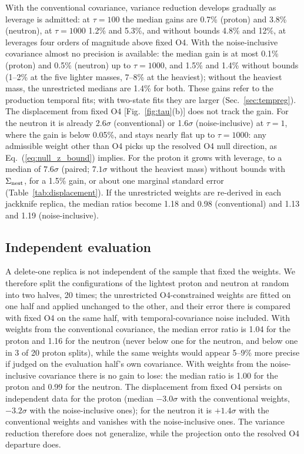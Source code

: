 \documentclass[aps,prd,preprint,nofootinbib,floatfix]{revtex4-2}
\begin{document}
With the conventional covariance, variance reduction develops gradually as leverage is admitted: at $\tau=100$ the median gains are 0.7\% (proton) and 3.8\% (neutron), at $\tau=1000$ 1.2\% and 5.3\%, and without bounds 4.8\% and 12\%, at leverages four orders of magnitude above fixed O4. With the noise-inclusive covariance almost no precision is available: the median gain is at most 0.1\% (proton) and 0.5\% (neutron) up to $\tau=1000$, and 1.5\% and 1.4\% without bounds (1--2\% at the five lighter masses, 7--8\% at the heaviest); without the heaviest mass, the unrestricted medians are 1.4\% for both. These gains refer to the production temporal fits; with two-state fits they are larger (Sec.~\ref{sec:tempreg}). The displacement from fixed O4 [Fig.~\ref{fig:tau}(b)] does not track the gain. For the neutron it is already 2.6$\sigma$ (conventional) or 1.6$\sigma$ (noise-inclusive) at $\tau=1$, where the gain is below 0.05\%, and stays nearly flat up to $\tau=1000$: any admissible weight other than O4 picks up the resolved O4 null direction, as Eq.~(\ref{eq:null_z_bound}) implies. For the proton it grows with leverage, to a median of $7.6\sigma$ (paired; $7.1\sigma$ without the heaviest mass) without bounds with $\Sigma_{\rm nest}$, for a 1.5\% gain, or about one marginal standard error (Table~\ref{tab:displacement}). If the unrestricted weights are re-derived in each jackknife replica, the median ratios become 1.18 and 0.98 (conventional) and 1.13 and 1.19 (noise-inclusive).

\subsection{Independent evaluation}

A delete-one replica is not independent of the sample that fixed the weights. We therefore split the configurations of the lightest proton and neutron at random into two halves, 20 times; the unrestricted O4-constrained weights are fitted on one half and applied unchanged to the other, and their error there is compared with fixed O4 on the same half, with temporal-covariance noise included. With weights from the conventional covariance, the median error ratio is 1.04 for the proton and 1.16 for the neutron (never below one for the neutron, and below one in 3 of 20 proton splits), while the same weights would appear 5--9\% more precise if judged on the evaluation half's own covariance. With weights from the noise-inclusive covariance there is no gain to lose: the median ratio is 1.00 for the proton and 0.99 for the neutron. The displacement from fixed O4 persists on independent data for the proton (median $-3.0\sigma$ with the conventional weights, $-3.2\sigma$ with the noise-inclusive ones); for the neutron it is $+1.4\sigma$ with the conventional weights and vanishes with the noise-inclusive ones. The variance reduction therefore does not generalize, while the projection onto the resolved O4 departure does.
\end{document}

